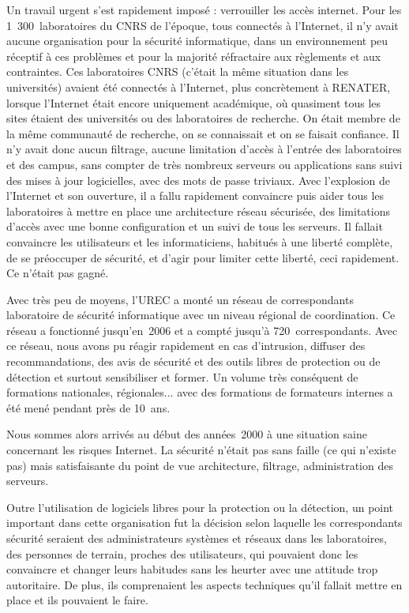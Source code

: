 \documentclass{FramateX}
\begin{document}
\begin{refsection}
Un travail urgent s'est rapidement imposé : verrouiller les accès
internet. Pour les 1~300~laboratoires du CNRS de l'époque, tous
connectés à l'Internet, il n'y avait aucune organisation pour la
sécurité informatique, dans un environnement peu réceptif à ces
problèmes et pour la majorité réfractaire aux règlements et aux
contraintes. Ces laboratoires CNRS (c'était la même situation dans les
universités) avaient été connectés à l'Internet, plus concrètement à
RENATER, lorsque l'Internet était encore uniquement académique, où
quasiment tous les sites étaient des universités ou des laboratoires de
recherche. On était membre de la même communauté de recherche, on se
connaissait et on se faisait confiance. Il n'y avait donc aucun
filtrage, aucune limitation d'accès à l'entrée des laboratoires et des
campus, sans compter de très nombreux serveurs ou applications sans
suivi des mises à jour logicielles, avec des mots de passe triviaux.
Avec l'explosion de l'Internet et son ouverture, il a fallu rapidement
convaincre puis aider tous les laboratoires à mettre en place une
architecture réseau sécurisée, des limitations d'accès avec une bonne
configuration et un suivi de tous les serveurs. Il fallait convaincre
les utilisateurs et les informaticiens, habitués à une liberté
complète, de se préoccuper de sécurité, et d'agir pour limiter cette
liberté, ceci rapidement. Ce n'était pas gagné.

Avec très peu de moyens, l'UREC a monté un réseau de correspondants
laboratoire de sécurité informatique avec un niveau régional de
coordination. Ce réseau a fonctionné jusqu'en~2006 et a compté jusqu'à
720~correspondants. Avec ce réseau, nous avons pu réagir rapidement en
cas d'intrusion, diffuser des recommandations, des avis de sécurité et
des outils libres de protection ou de détection et surtout sensibiliser
et former. Un volume très conséquent de formations nationales,
régionales... avec des formations de formateurs internes a été mené
pendant près de 10~ans. 

Nous sommes alors arrivés au début des années~2000 à une situation saine
concernant les risques Internet. La sécurité n'était pas sans faille
(ce qui n'existe pas) mais satisfaisante du point de vue architecture,
filtrage, administration des serveurs.

Outre l'utilisation de logiciels libres pour la protection ou la
détection, un point important dans cette organisation fut la décision
selon laquelle les correspondants sécurité seraient des administrateurs
systèmes et réseaux dans les laboratoires, des personnes de terrain,
proches des utilisateurs, qui pouvaient donc les convaincre et changer
leurs habitudes sans les heurter avec une attitude trop autoritaire. De
plus, ils comprenaient les aspects techniques qu'il fallait mettre en
place et ils pouvaient le faire. 


\end{refsection}
\end{document}
